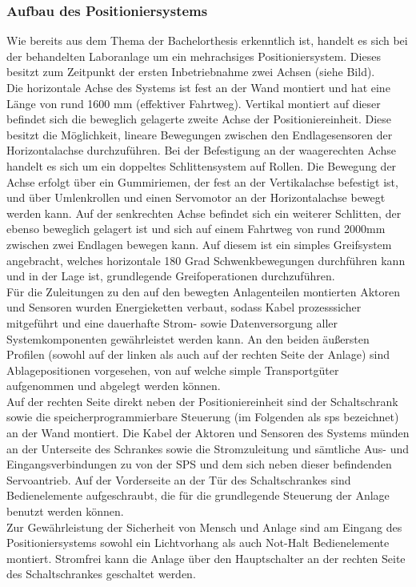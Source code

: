 \documentclass[../Bachelorarbeit.tex]{subfiles}
\begin{document}
\subsubsection{Aufbau des Positioniersystems} \label{aufbau}
Wie bereits aus dem Thema der Bachelorthesis erkenntlich ist, handelt es sich bei der behandelten Laboranlage um ein mehrachsiges Positioniersystem. Dieses besitzt zum Zeitpunkt der ersten Inbetriebnahme zwei Achsen (siehe Bild).\\
Die horizontale Achse des Systems ist fest an der Wand montiert und hat eine Länge von rund 1600 mm (effektiver Fahrtweg). Vertikal montiert auf dieser befindet sich die beweglich gelagerte zweite Achse der Positioniereinheit. Diese besitzt die Möglichkeit, lineare Bewegungen zwischen den Endlagesensoren der Horizontalachse durchzuführen. Bei der Befestigung an der waagerechten Achse handelt es sich um ein doppeltes Schlittensystem auf Rollen. Die Bewegung der Achse erfolgt über ein Gummiriemen, der fest an der Vertikalachse befestigt ist, und über Umlenkrollen und einen Servomotor an der Horizontalachse bewegt werden kann. Auf der senkrechten Achse befindet sich ein weiterer Schlitten, der ebenso beweglich gelagert ist und sich auf einem Fahrtweg von rund 2000mm zwischen zwei Endlagen bewegen kann. Auf diesem ist ein simples Greifsystem angebracht, welches horizontale 180 Grad Schwenkbewegungen durchführen kann und in der Lage ist, grundlegende Greifoperationen durchzuführen.\\
Für die Zuleitungen zu den auf den bewegten Anlagenteilen montierten Aktoren und Sensoren wurden Energieketten verbaut, sodass Kabel prozesssicher mitgeführt und eine dauerhafte Strom- sowie Datenversorgung aller Systemkomponenten gewährleistet werden kann. An den beiden äußersten Profilen (sowohl auf der linken als auch auf der rechten Seite der Anlage) sind Ablagepositionen vorgesehen, von \bzw auf welche simple Transportgüter aufgenommen und abgelegt werden können.\\
Auf der rechten Seite direkt neben der Positioniereinheit sind der Schaltschrank sowie die speicherprogrammierbare Steuerung (im Folgenden als \acs{sps} bezeichnet) an der Wand montiert. Die Kabel der Aktoren und Sensoren des Systems münden an der Unterseite des Schrankes sowie die Stromzuleitung und sämtliche Aus- und Eingangsverbindungen zu \bzw von der SPS und dem sich neben dieser befindenden Servoantrieb. Auf der Vorderseite an der Tür des Schaltschrankes sind Bedienelemente aufgeschraubt, die für die grundlegende Steuerung der Anlage benutzt werden können.\\
Zur Gewährleistung der Sicherheit von Mensch und Anlage sind am Eingang des Positioniersystems sowohl ein Lichtvorhang als auch Not-Halt Bedienelemente montiert. Stromfrei kann die Anlage über den Hauptschalter an der rechten Seite des Schaltschrankes geschaltet werden.
\end{document}
